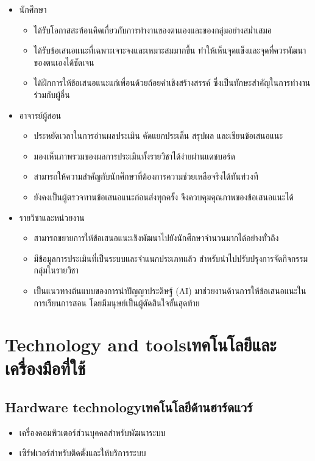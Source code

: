 \begin{itemize}
  \item นักศึกษา
  \begin{itemize}
    \item ได้รับโอกาสสะท้อนคิดเกี่ยวกับการทำงานของตนเองและของกลุ่มอย่างสม่ำเสมอ
    \item ได้รับข้อเสนอแนะที่เฉพาะเจาะจงและเหมาะสมมากขึ้น ทำให้เห็นจุดแข็งและจุดที่ควรพัฒนาของตนเองได้ชัดเจน
    \item ได้ฝึกการให้ข้อเสนอแนะแก่เพื่อนด้วยถ้อยคำเชิงสร้างสรรค์ ซึ่งเป็นทักษะสำคัญในการทำงานร่วมกับผู้อื่น
  \end{itemize}
  \item อาจารย์ผู้สอน
  \begin{itemize}
    \item ประหยัดเวลาในการอ่านผลประเมิน คัดแยกประเด็น สรุปผล และเขียนข้อเสนอแนะ
    \item มองเห็นภาพรวมของผลการประเมินทั้งรายวิชาได้ง่ายผ่านแดชบอร์ด
    \item สามารถให้ความสำคัญกับนักศึกษาที่ต้องการความช่วยเหลือจริงได้ทันท่วงที
    \item ยังคงเป็นผู้ตรวจทานข้อเสนอแนะก่อนส่งทุกครั้ง จึงควบคุมคุณภาพของข้อเสนอแนะได้
  \end{itemize}
  \item รายวิชาและหน่วยงาน
  \begin{itemize}
    \item สามารถขยายการให้ข้อเสนอแนะเชิงพัฒนาไปยังนักศึกษาจำนวนมากได้อย่างทั่วถึง
    \item มีข้อมูลการประเมินที่เป็นระบบและจำแนกประเภทแล้ว สำหรับนำไปปรับปรุงการจัดกิจกรรมกลุ่มในรายวิชา
    \item เป็นแนวทางต้นแบบของการนำปัญญาประดิษฐ์ (AI) มาช่วยงานด้านการให้ข้อเสนอแนะในการเรียนการสอน โดยมีมนุษย์เป็นผู้ตัดสินใจขั้นสุดท้าย
  \end{itemize}
\end{itemize}

\section{\ifenglish Technology and tools\else เทคโนโลยีและเครื่องมือที่ใช้\fi}

\subsection{\ifenglish Hardware technology\else เทคโนโลยีด้านฮาร์ดแวร์\fi}

\begin{itemize}
  \item เครื่องคอมพิวเตอร์ส่วนบุคคลสำหรับพัฒนาระบบ
  \item เซิร์ฟเวอร์สำหรับติดตั้งและให้บริการระบบ
\end{itemize}

